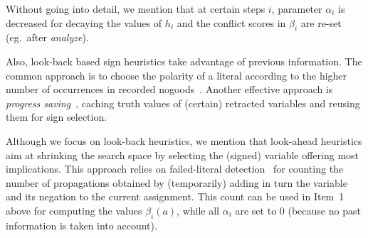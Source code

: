Without going into detail, 
we mention that at certain steps $i$,
parameter $\alpha_i$ is decreased for decaying the values of $h_i$ and
the conflict scores in $\beta_i$ are re-set (eg.~after \textit{analyze}).

Also, look-back based sign heuristics take advantage of previous information.
The common approach is to choose the polarity of a literal according to the higher
number of occurrences in recorded nogoods~\cite{momazhzhma01a}.
Another effective approach is \emph{progress saving}~\cite{pipdar07a},
caching truth values of (certain) retracted variables and reusing them for sign selection.

Although we focus on look-back heuristics,
we mention that look-ahead heuristics 
aim at shrinking the search space by selecting the (signed) variable offering most implications.
This approach relies on failed-literal detection~\cite{freeman95a} for counting the number of
propagations obtained by (temporarily) adding in turn the variable and its negation to the current
assignment.
This count can be used in Item~1 above for computing the values $\beta_i(a)$,
while all $\alpha_i$ are set to 0 (because no past information is taken into account).

